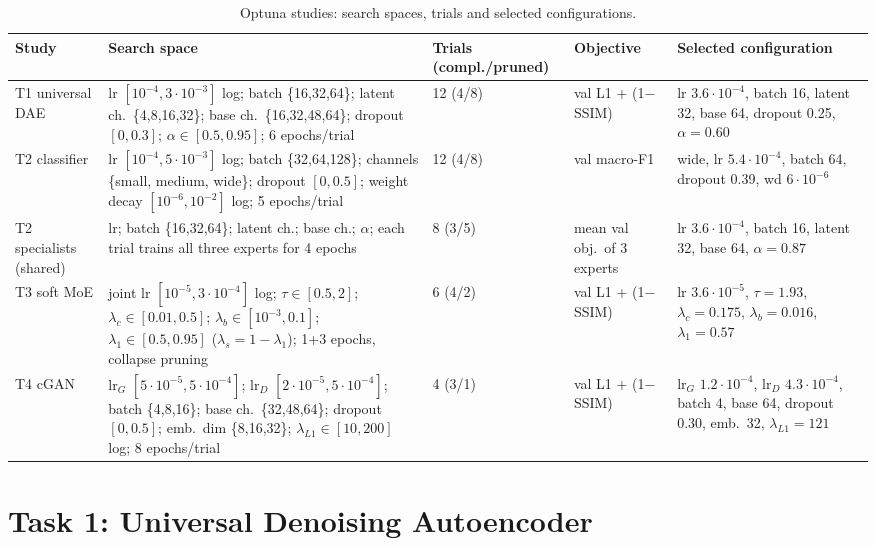 \documentclass[conference]{IEEEtran}
\begin{document}
\begin{table}[t]\centering\caption{Optuna studies: search spaces, trials and selected configurations.}\label{tab:optuna}\setlength{\tabcolsep}{3pt}\footnotesize
\begin{tabular}{p{2.1cm}p{6.6cm}p{1.6cm}p{2.3cm}p{4.3cm}}\toprule
Study & Search space & Trials (compl./pruned) & Objective & Selected configuration \\ \midrule
T1 universal DAE & lr $[10^{-4},3{\cdot}10^{-3}]$ log; batch \{16,32,64\}; latent ch.\ \{4,8,16,32\}; base ch.\ \{16,32,48,64\}; dropout $[0,0.3]$; $\alpha\in[0.5,0.95]$; 6 epochs/trial & 12 (4/8) & val L1 + (1$-$SSIM) & lr $3.6{\cdot}10^{-4}$, batch 16, latent 32, base 64, dropout 0.25, $\alpha=0.60$ \\
T2 classifier & lr $[10^{-4},5{\cdot}10^{-3}]$ log; batch \{32,64,128\}; channels \{small, medium, wide\}; dropout $[0,0.5]$; weight decay $[10^{-6},10^{-2}]$ log; 5 epochs/trial & 12 (4/8) & val macro-F1 & wide, lr $5.4{\cdot}10^{-4}$, batch 64, dropout 0.39, wd $6{\cdot}10^{-6}$ \\
T2 specialists (shared) & lr; batch \{16,32,64\}; latent ch.; base ch.; $\alpha$; each trial trains all three experts for 4 epochs & 8 (3/5) & mean val obj.\ of 3 experts & lr $3.6{\cdot}10^{-4}$, batch 16, latent 32, base 64, $\alpha=0.87$ \\
T3 soft MoE & joint lr $[10^{-5},3{\cdot}10^{-4}]$ log; $\tau\in[0.5,2]$; $\lambda_c\in[0.01,0.5]$; $\lambda_b\in[10^{-3},0.1]$; $\lambda_1\in[0.5,0.95]$ ($\lambda_s=1-\lambda_1$); 1+3 epochs, collapse pruning & 6 (4/2) & val L1 + (1$-$SSIM) & lr $3.6{\cdot}10^{-5}$, $\tau=1.93$, $\lambda_c=0.175$, $\lambda_b=0.016$, $\lambda_1=0.57$ \\
T4 cGAN & lr$_G$ $[5{\cdot}10^{-5},5{\cdot}10^{-4}]$; lr$_D$ $[2{\cdot}10^{-5},5{\cdot}10^{-4}]$; batch \{4,8,16\}; base ch.\ \{32,48,64\}; dropout $[0,0.5]$; emb.\ dim \{8,16,32\}; $\lambda_{L1}\in[10,200]$ log; 8 epochs/trial & 4 (3/1) & val L1 + (1$-$SSIM) & lr$_G$ $1.2{\cdot}10^{-4}$, lr$_D$ $4.3{\cdot}10^{-4}$, batch 4, base 64, dropout 0.30, emb.\ 32, $\lambda_{L1}=121$ \\ \bottomrule
\end{tabular}\end{table}

\section{Task 1: Universal Denoising Autoencoder}
\end{document}
